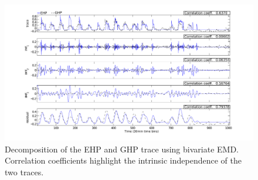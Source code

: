 
\begin{figure}[tb]
\hspace{-2cm}
\includegraphics[width=1.2\textwidth]{img/emd_25_41-eps-converted-to}
\vspace{-1cm}
\caption{Decomposition of the EHP and GHP trace using bivariate EMD. Correlation coefficients highlight the intrinsic independence of the two traces.}
\label{fig:emd2}
\end{figure}






